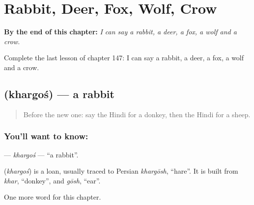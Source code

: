 
\chapter{Rabbit, Deer, Fox, Wolf, Crow}
\label{ch:hi-rabbit-deer-fox-wolf-crow}

\begin{chapteropening}
\textbf{By the end of this chapter:} \emph{I can say a rabbit, a deer, a fox, a wolf and a crow.}

Complete the last lesson of chapter 147: I can say a rabbit, a deer, a fox, a wolf and a crow.
\end{chapteropening}

\section[\texorpdfstring{\hi{खरगोश} (khargoś)}{खरगोश (khargoś)}]{ (khargoś) — a rabbit}

\label{lesson:HI-C147-khargos}



\begin{quote}
Before the new one: say the Hindi for a donkey, then the Hindi for a sheep.
\end{quote}

\subsection*{You'll want to know: }
\textbf{} — \emph{khargoś} — \textquotedblleft{}a rabbit\textquotedblright{}.

\begin{cousinweb}
\textbf{} (\emph{khargoś}) is a loan, usually traced to Persian \emph{khargōsh}, \textquotedblleft{}hare\textquotedblright{}. It is built from \emph{khar}, \textquotedblleft{}donkey\textquotedblright{}, and \emph{gōsh}, \textquotedblleft{}ear\textquotedblright{}.
\end{cousinweb}

\begin{grammarlens}[title={What you've built}]
One more word for this chapter.
\end{grammarlens}


